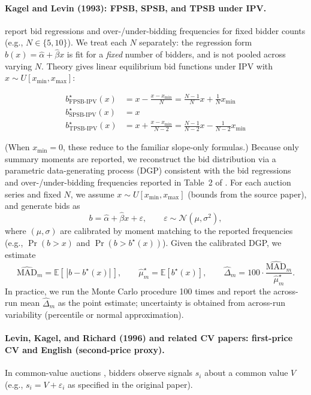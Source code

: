 \paragraph{Kagel and Levin (1993): FPSB, SPSB, and TPSB under IPV.}
\citet{kagel1993independent} report bid regressions and over-/under-bidding frequencies for fixed bidder counts (e.g., $N\in\{5,10\}$). We treat each $N$ separately: the regression form $\hat b(x)=\hat\alpha+\hat\beta x$ is fit for a \emph{fixed} number of bidders, and is not pooled across varying $N$.
Theory gives linear equilibrium bid functions under IPV with $x\sim U[x_{\min},x_{\max}]$:

$$\begin{aligned}
b^\star_{\mathrm{FPSB\text{-}IPV}}(x) &= x - \frac{x-x_{\min}}{N} = \frac{N-1}{N}x + \frac{1}{N}x_{\min} \\
b^\star_{\mathrm{SPSB\text{-}IPV}}(x) &= x \\
b^\star_{\mathrm{TPSB\text{-}IPV}}(x) &= x + \frac{x-x_{\min}}{N-2} = \frac{N-1}{N-2}x - \frac{1}{N-2}x_{\min}
\end{aligned}$$

(When $x_{\min}=0$, these reduce to the familiar slope-only formulas.)
Because only summary moments are reported, we reconstruct the bid distribution via a parametric data-generating process (DGP) consistent with the bid regressions and over-/under-bidding frequencies reported in Table~2 of \citet{kagel1993independent}.
For each auction series and fixed $N$, we assume $x\sim U[x_{\min},x_{\max}]$ (bounds from the source paper), and generate bids as
\[
b = \hat\alpha+\hat\beta x + \varepsilon,\qquad \varepsilon\sim \mathcal N(\mu,\sigma^2),
\]
where $(\mu,\sigma)$ are calibrated by moment matching to the reported frequencies (e.g., $\Pr(b>x)$ and $\Pr(b>b^\star(x))$).
Given the calibrated DGP, we estimate
\[
\widehat{\mathrm{MAD}}_m = \mathbb E\!\left[\,|b-b^\star(x)|\,\right],
\qquad
\widehat{\mu}_m^\star=\mathbb E[b^\star(x)],
\qquad
\widehat{\Delta}_m = 100\cdot \frac{\widehat{\mathrm{MAD}}_m}{\widehat{\mu}_m^\star}.
\]
In practice, we run the Monte Carlo procedure 100 times and report the across-run mean $\widehat{\Delta}_m$ as the point estimate; uncertainty is obtained from across-run variability (percentile or normal approximation).

\paragraph{Levin, Kagel, and Richard (1996) and related CV papers: first-price CV and English (second-price proxy).}
In common-value auctions \citep{levin1996revenue}, bidders observe signals $s_i$ about a common value $V$ (e.g., $s_i=V+\varepsilon_i$ as specified in the original paper).

